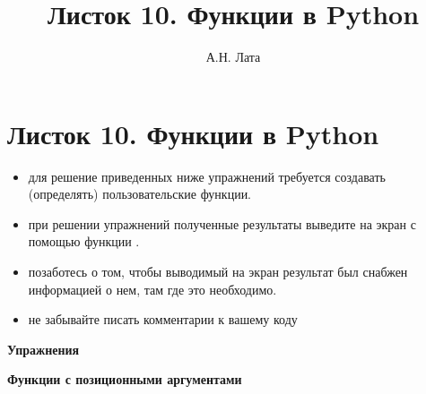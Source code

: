 \documentclass[a4,12pt]{article}
\title{Листок 10. Функции в Python}
\author{А.Н. Лата}
\theoremstyle{remark}
\begin{document}
 


\section*{\centering Листок 10. Функции в Python}

\begin{exercisenote}[title=Замечания]
\begin{itemize}
    \item для решение приведенных ниже упражнений требуется создавать (определять) пользовательские функции.
    \item при решении упражнений полученные результаты выведите на экран с помощью функции {\color{blue}{print()}}.
    \item позаботесь о том, чтобы выводимый на экран результат был снабжен информацией о нем, там где это необходимо.
    \item не забывайте писать комментарии к вашему коду
\end{itemize}
\end{exercisenote}

\textbf{Упражнения}

\textbf{Функции с позиционными аргументами}
\end{document}
